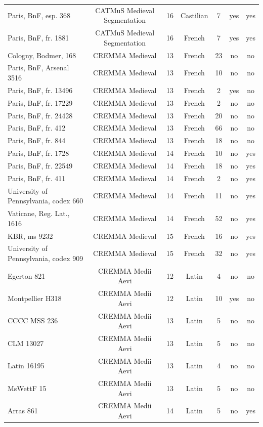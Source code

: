 \begin{table}[htbp]
\begin{tabular}{lcccccc}
    Paris, BnF, esp. 368 & CATMuS Medieval Segmentation & 16 & Castilian & 7 & yes & yes \\
    Paris, BnF, fr. 1881 & CATMuS Medieval Segmentation & 16 & French & 7 & yes & yes \\
    Cologny, Bodmer, 168 & CREMMA Medieval & 13 & French & 23 & no & no \\
    Paris, BnF, Arsenal 3516 & CREMMA Medieval & 13 & French & 10 & no & no \\
    Paris, BnF, fr. 13496 & CREMMA Medieval & 13 & French & 2 & yes & no \\
    Paris, BnF, fr. 17229 & CREMMA Medieval & 13 & French & 2 & no & no \\
    Paris, BnF, fr. 24428 & CREMMA Medieval & 13 & French & 20 & no & no \\
    Paris, BnF, fr. 412 & CREMMA Medieval & 13 & French & 66 & no & no \\
    Paris, BnF, fr. 844 & CREMMA Medieval & 13 & French & 18 & no & no \\
    Paris, BnF, fr. 1728 & CREMMA Medieval & 14 & French & 10 & no & yes \\
    Paris, BnF, fr. 22549 & CREMMA Medieval & 14 & French & 18 & no & yes \\
    Paris, BnF, fr. 411 & CREMMA Medieval & 14 & French & 2 & no & yes \\
    University of Pennsylvania, codex 660 & CREMMA Medieval & 14 & French & 11 & no & yes \\
    Vaticane, Reg. Lat., 1616 & CREMMA Medieval & 14 & French & 52 & no & yes \\
    KBR, ms 9232 & CREMMA Medieval & 15 & French & 16 & no & yes \\
    University of Pennsylvania, codex 909 & CREMMA Medieval & 15 & French & 32 & no & yes \\
    Egerton 821 & CREMMA Medii Aevi & 12 & Latin & 4 & no & no \\
    Montpellier H318 & CREMMA Medii Aevi & 12 & Latin & 10 & yes & no \\
    CCCC MSS 236 & CREMMA Medii Aevi & 13 & Latin & 5 & no & no \\
    CLM 13027 & CREMMA Medii Aevi & 13 & Latin & 5 & no & no \\
    Latin 16195 & CREMMA Medii Aevi & 13 & Latin & 4 & no & no \\
    MsWettF 15 & CREMMA Medii Aevi & 13 & Latin & 5 & no & no \\
    Arras 861 & CREMMA Medii Aevi & 14 & Latin & 5 & no & yes \\

\end{tabular}
\end{table}
